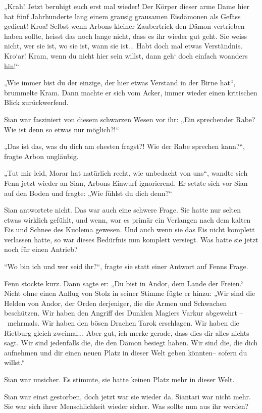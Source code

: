 \documentclass[10pt, a4paper, oneside]{book}
\begin{document}
„Krah! Jetzt beruhigt euch erst mal wieder! Der Körper dieser arme Dame hier hat fünf Jahrhunderte lang einem grausig grausamen Eisdämonen als Gefäss gedient! Kroa! Selbst wenn Arbons kleiner Zaubertrick den Dämon vertrieben haben sollte, heisst das noch lange nicht, dass es ihr wieder gut geht. Sie weiss nicht, wer sie ist, wo sie ist, wann sie ist... Habt doch mal etwas Verständnis. Kro‘ar! Kram, wenn du nicht hier sein willst, dann geh‘ doch einfach woanders hin!“

„Wie immer bist du der einzige, der hier etwas Verstand in der Birne hat“, brummelte Kram. Dann machte er sich vom Acker, immer wieder einen kritischen Blick zurückwerfend.

Sian war fasziniert von diesem schwarzen Wesen vor ihr: „Ein sprechender Rabe? Wie ist denn so etwas nur möglich?!“

„Das ist das, was du dich am ehesten fragst?! Wie der Rabe sprechen kann?“, fragte Arbon ungläubig.

„Tut mir leid, Morar hat natürlich recht, wie unbedacht von uns“, wandte sich Fenn jetzt wieder an Sian, Arbons Einwurf ignorierend. Er setzte sich vor Sian auf den Boden und fragte: „Wie fühlst du dich denn?“

Sian antwortete nicht. Das war auch eine schwere Frage. Sie hatte nur selten etwas wirklich gefühlt, und wenn, war es primär ein Verlangen nach dem kalten Eis und Schnee des Kuolema gewesen. Und auch wenn sie das Eis nicht komplett verlassen hatte, so war dieses Bedürfnis nun komplett versiegt. Was hatte sie jetzt noch für einen Antrieb?

“Wo bin ich und wer seid ihr?“, fragte sie statt einer Antwort auf Fenns Frage.

Fenn stockte kurz. Dann sagte er: „Du bist in Andor, dem Lande der Freien.“ Nicht ohne einen Anflug von Stolz in seiner Stimme fügte er hinzu: „Wir sind die Helden von Andor, der Orden derjeniger, die die Armen und Schwachen beschützen. Wir haben den Angriff des Dunklen Magiers Varkur abgewehrt – mehrmals. Wir haben den bösen Drachen Tarok erschlagen. Wir haben die Rietburg gleich zweimal... Aber gut, ich merke gerade, dass dies dir alles nichts sagt. Wir sind jedenfalls die, die den Dämon besiegt haben. Wir sind die, die dich aufnehmen und dir einen neuen Platz in dieser Welt geben könnten– sofern du willst.“

Sian war unsicher. Es stimmte, sie hatte keinen Platz mehr in dieser Welt.

Sian war einst gestorben, doch jetzt war sie wieder da. Siantari war nicht mehr. Sie war sich ihrer Menschlichkeit wieder sicher. Was sollte nun aus ihr werden?
\end{document}
